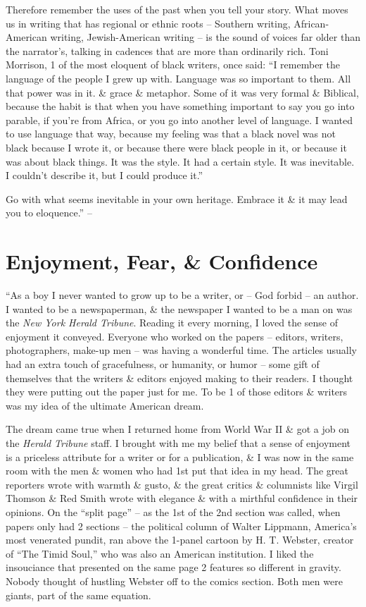 \documentclass{article}
\numberwithin{equation}{section}
\begin{document}
Therefore remember the uses of the past when you tell your story. What moves us in writing that has regional or ethnic roots -- Southern writing, African-American writing, Jewish-American writing -- is the sound of voices far older than the narrator's, talking in cadences that are more than ordinarily rich. Toni Morrison, 1 of the most eloquent of black writers, once said: ``I remember the language of the people I grew up with. Language was so important to them. All that power was in it. \& grace \& metaphor. Some of it was very formal \& Biblical, because the habit is that when you have something important to say you go into parable, if you're from Africa, or you go into another level of language. I wanted to use language that way, because my feeling was that a black novel was not black because I wrote it, or because there were black people in it, or because it was about black things. It was the style. It had a certain style. It was inevitable. I couldn't describe it, but I could produce it.''

Go with what seems inevitable in your own heritage. Embrace it \& it may lead you to eloquence.'' -- \cite[pp. 217--225]{Zinsser2016}


\section{Enjoyment, Fear, \& Confidence}
``As a boy I never wanted to grow up to be a writer, or -- God forbid -- an author. I wanted to be a newspaperman, \& the newspaper I wanted to be a man on was the \textit{New York Herald Tribune}. Reading it every morning, I loved the sense of enjoyment it conveyed. Everyone who worked on the papers -- editors, writers, photographers, make-up men -- was having a wonderful time. The articles usually had an extra touch of gracefulness, or humanity, or humor -- some gift of themselves that the writers \& editors enjoyed making to their readers. I thought they were putting out the paper just for me. To be 1 of those editors \& writers was my idea of the ultimate American dream.

The dream came true when I returned home from World War II \& got a job on the \textit{Herald Tribune} staff. I brought with me my belief that a sense of enjoyment is a priceless attribute for a writer or for a publication, \& I was now in the same room with the men \& women who had 1st put that idea in my head. The great reporters wrote with warmth \& gusto, \& the great critics \& columnists like Virgil Thomson \& Red Smith wrote with elegance \& with a mirthful confidence in their opinions. On the ``split page'' -- as the 1st of the 2nd section was called, when papers only had 2 sections -- the political column of Walter Lippmann, America's most venerated pundit, ran above the 1-panel cartoon by H. T. Webster, creator of ``The Timid Soul,'' who was also an American institution. I liked the insouciance that presented on the same page 2 features so different in gravity. Nobody thought of hustling Webster off to the comics section. Both men were giants, part of the same equation.
\end{document}
